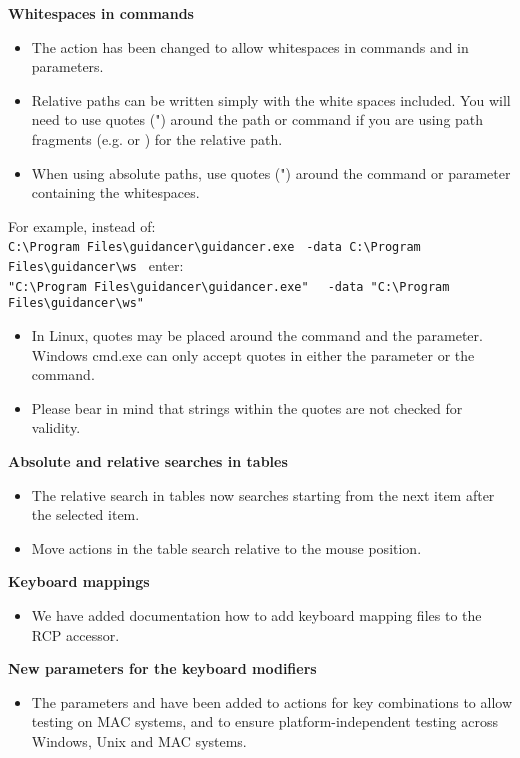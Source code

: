 \textbf{Whitespaces in commands}
\begin{itemize}
\item The action  has been changed to allow whitespaces in commands and in parameters. 
\item Relative paths can be written simply with the white spaces included. You will need to use quotes (") around the path or command if you are using path fragments (e.g.  or ) for the relative path.  
\item When using absolute paths, use quotes (") around the command or parameter containing the whitespaces. 

\end{itemize}
For example, instead of: \\
\verb+C:\Program Files\guidancer\guidancer.exe +
\newline
\verb+-data C:\Program Files\guidancer\ws +
\newline
enter:\\
\verb+"C:\Program Files\guidancer\guidancer.exe" +
\newline
\verb+ -data "C:\Program Files\guidancer\ws" +
\begin{itemize}
\item In Linux, quotes may be placed around the command and the parameter. Windows cmd.exe can only accept quotes in either the parameter or the command. 
\item Please bear in mind that strings within the quotes are not checked for validity. 

\end{itemize}

\textbf{Absolute and relative searches in tables}
\begin{itemize}
\item The relative search in tables now searches starting from the next item after the selected item.
\item Move actions in the table search relative to the mouse position. 
\end{itemize}

\textbf{Keyboard mappings}
\begin{itemize}
\item We have added documentation how to add keyboard mapping files to the RCP accessor. 
\end{itemize}

\textbf{New parameters for the keyboard modifiers}
\begin{itemize}
\item The parameters  and  have been added to actions for key combinations to allow testing on MAC systems, and to ensure platform-independent testing across Windows, Unix and MAC systems.
\end{itemize}

